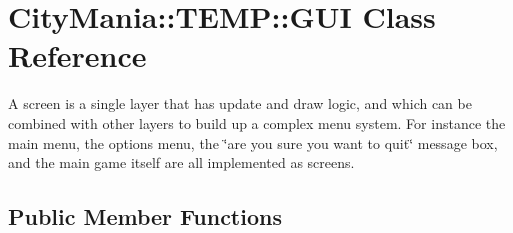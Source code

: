 \hypertarget{classCityMania_1_1TEMP_1_1GUI}{
\section{CityMania::TEMP::GUI Class Reference}
\label{classCityMania_1_1TEMP_1_1GUI}
}


A screen is a single layer that has update and draw logic, and which can be combined with other layers to build up a complex menu system. For instance the main menu, the options menu, the \char`\"{}are you sure you
        want to quit\char`\"{} message box, and the main game itself are all implemented as screens.  
\subsection*{Public Member Functions}
